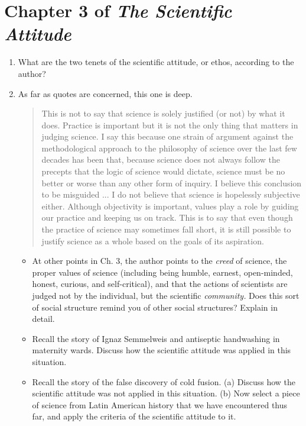 \documentclass[12pt]{article}
\begin{document}
\maketitle

\section{Chapter 3 of \textit{The Scientific Attitude}}

\begin{enumerate}
\item What are the two tenets of the scientific attitude, or ethos, according to the author? \\ \vspace{0.5cm}
\item As far as quotes are concerned, this one is deep.
\begin{quotation}
This is not to say that science is solely justified (or not) by what it does.  Practice is important but it is not the only thing that matters in judging science.  I say this because one strain of argument against the methodological approach to the philosophy of science over the last few decades has been that, because science does not always follow the precepts that the logic of science would dictate, science must be no better or worse than any other form of inquiry.  I believe this conclusion to be misguided ... I do not believe that science is hopelessly subjective either.  Although objectivity is important, values play a role by guiding our practice and keeping us on track.  This is to say that even though the practice of science may sometimes fall short, it is still possible to justify science as a whole based on the goals of its aspiration.
\end{quotation}
\begin{itemize}
\item At other points in Ch. 3, the author points to the \textit{creed} of science, the proper values of science (including being humble, earnest, open-minded, honest, curious, and self-critical), and that the actions of scientists are judged not by the individual, but the scientific \textit{community.}  Does this sort of social structure remind you of other social structures?  Explain in detail. \\ \vspace{1.5cm}
\item Recall the story of Ignaz Semmelweis and antiseptic handwashing in maternity wards.  Discuss how the scientific attitude was applied in this situation. \\ \vspace{1cm}
\item Recall the story of the false discovery of cold fusion.  (a) Discuss how the scientific attitude was not applied in this situation. (b) Now select a piece of science from Latin American history that we have encountered thus far, and apply the criteria of the scientific attitude to it.  \\ \vspace{1cm}
\end{itemize}
\end{enumerate}
\end{document}
